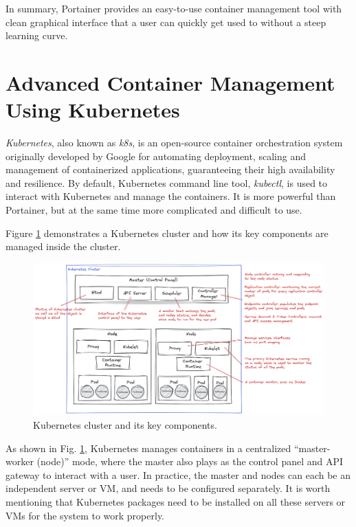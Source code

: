 In summary, Portainer provides an easy-to-use container management tool with clean graphical interface that a user can quickly get used to without a steep learning curve.

\section{Advanced Container Management Using Kubernetes}

\textit{Kubernetes}, also known as \textit{k8s}, is an open-source container orchestration system originally developed by Google for automating deployment, scaling and management of containerized applications, guaranteeing their high availability and resilience. By default, Kubernetes command line tool, \textit{kubectl}, is used to interact with Kubernetes and manage the containers. It is more powerful than Portainer, but at the same time more complicated and difficult to use.

Figure \ref{ch:vac:fig:kubernetescluster} demonstrates a Kubernetes cluster and how its key components are managed inside the cluster.
\begin{figure}
	\centering
	\includegraphics[width=350pt]{chapters/ch-virtualization-and-containerization/figures/kubernetescluster.png}
	\caption{Kubernetes cluster and its key components.} \label{ch:vac:fig:kubernetescluster}
\end{figure}

As shown in Fig. \ref{ch:vac:fig:kubernetescluster}, Kubernetes manages containers in a centralized ``master-worker (node)'' mode, where the master also plays as the control panel and API gateway to interact with a user. In practice, the master and nodes can each be an independent server or VM, and needs to be configured separately. It is worth mentioning that Kubernetes packages need to be installed on all these servers or VMs for the system to work properly.

